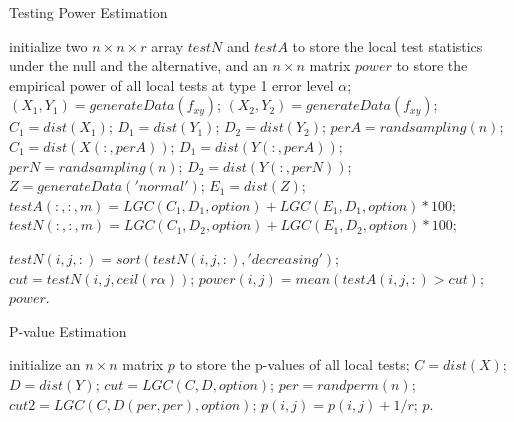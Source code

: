 \documentclass[11pt]{article}
\begin{document}
\begin{algorithm}
\caption{Testing Power Estimation}
\label{algPower}
\begin{algorithmic}
\State initialize two $n \times n \times r$ array $testN$ and $testA$ to store the local test statistics under the null and the alternative, and an $n \times n$ matrix $power$ to store the empirical power of all local tests at type 1 error level $\alpha$;
\State $(X_{1},Y_{1})=generateData(f_{xy})$; 
\State $(X_{2},Y_{2})=generateData(f_{xy})$; 
\State $C_{1}=dist(X_{1})$; $D_{1}=dist(Y_{1})$; $D_{2}=dist(Y_{2})$;
\Else
\State $perA=randsampling(n)$;
\State $C_{1}=dist(X(:,perA))$; $D_{1}=dist(Y(:,perA))$; 
\State $perN=randsampling(n)$;
\State $D_{2}=dist(Y(:,perN))$; 
\State $Z=generateData('normal')$;
\State $E_{1}=dist(Z)$;
\EndIf
\State $testA(:,:,m)=LGC(C_{1},D_{1},option)+LGC(E_{1},D_{1},option)*100$; 
\State $testN(:,:,m)=LGC(C_{1},D_{2},option)+LGC(E_{1},D_{2},option)*100$;
\EndFor

\State $testN(i,j,:)=sort(testN(i,j,:),'decreasing')$; 
\State $cut=testN(i,j,ceil(r\alpha))$; 
\State $power(i,j)=mean(testA(i,j,:)>cut)$; 
\EndFor
\EndFor
\State \Return $power$.
\EndFunction
\end{algorithmic}
\end{algorithm}

\begin{algorithm}
\caption{P-value Estimation}
\label{algPerm}
\begin{algorithmic}
\State initialize an $n \times n$ matrix $p$ to store the p-values of all local tests;
\State $C=dist(X)$; $D=dist(Y)$; 
\State $cut=LGC(C,D,option)$; 
\State $per=randperm(n)$; 
\State $cut2=LGC(C,D(per,per),option)$; 
\State $p(i,j)=p(i,j)+1/r$;
\EndIf
\EndFor
\EndFor
\EndFor
\State \Return $p$.
\EndFunction
\end{algorithmic}
\end{algorithm}
\end{document}
